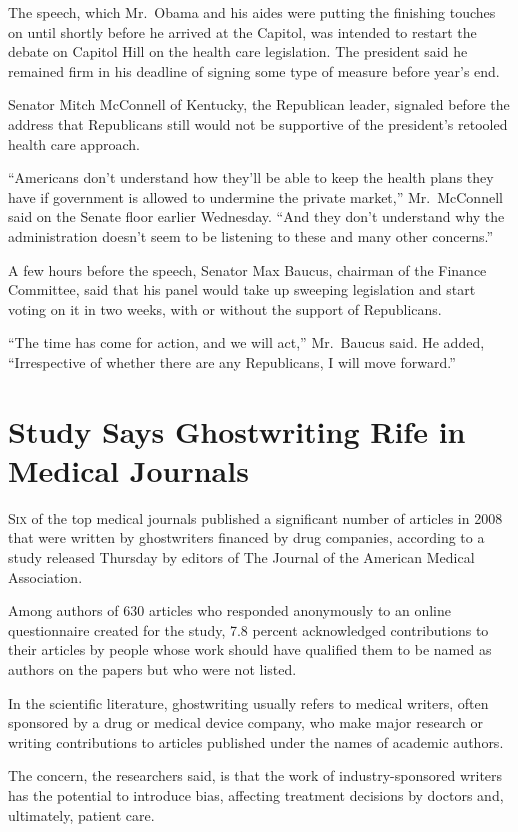 ﻿\documentclass[12pt]{article}
\begin{document}
The speech, which Mr.~Obama and his aides were putting the finishing touches on until shortly before
he arrived at the Capitol, was intended to restart the debate on Capitol Hill on the health care
legislation. The president said he remained firm in his deadline of signing some type of measure
before year's end.

Senator Mitch McConnell of Kentucky, the Republican leader, signaled before the address that
Republicans still would not be supportive of the president's retooled health care approach.

``Americans don't understand how they'll be able to keep the health plans they have if government is
allowed to undermine the private market,'' Mr.~McConnell said on the Senate floor earlier Wednesday.
``And they don't understand why the administration doesn't seem to be listening to these and many
other concerns.''

A few hours before the speech, Senator Max Baucus, chairman of the Finance Committee, said that his
panel would take up sweeping legislation and start voting on it in two weeks, with or without the
support of Republicans.

``The time has come for action, and we will act,'' Mr.~Baucus said. He added, ``Irrespective of
whether there are any Republicans, I will move forward.''

\section{Study Says Ghostwriting Rife in Medical Journals}

\lettrine{S}{ix} of the top medical journals published a significant number of articles in 2008 that
were written by ghostwriters financed by drug companies, according to a study released Thursday by
editors of The Journal of the American Medical Association.

Among authors of 630 articles who responded anonymously to an online questionnaire created for the
study, 7.8 percent acknowledged contributions to their articles by people whose work should have
qualified them to be named as authors on the papers but who were not listed.

In the scientific literature, ghostwriting usually refers to medical writers, often sponsored by a
drug or medical device company, who make major research or writing contributions to articles
published under the names of academic authors.

The concern, the researchers said, is that the work of industry-sponsored writers has the potential
to introduce bias, affecting treatment decisions by doctors and, ultimately, patient care.
\end{document}
